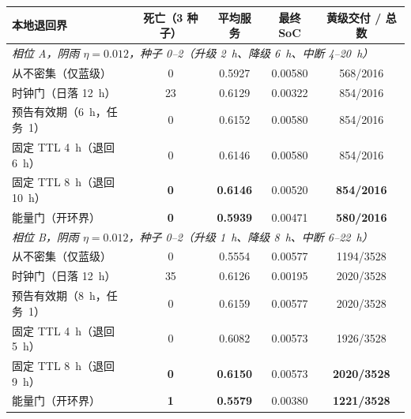 \begin{tabular}{lcccc}
\toprule
本地退回界 & 死亡（3 种子） & 平均服务 & 最终 SoC & 黄级交付 / 总数\\
\midrule
\multicolumn{5}{l}{\emph{相位 A，阴雨 $\eta{=}0.012$，种子 0--2（升级 2~h、降级 6~h、中断 4--20~h）}}\\
从不密集（仅蓝级） & 0 & 0.5927 & 0.00580 & 568/2016\\
时钟门（日落 12~h） & 23 & 0.6129 & 0.00322 & 854/2016\\
预告有效期（6~h，任务~1） & 0 & 0.6152 & 0.00580 & 854/2016\\
固定 TTL 4~h（退回 6~h） & 0 & 0.6146 & 0.00580 & 854/2016\\
固定 TTL 8~h（退回 10~h） & \textbf{0} & \textbf{0.6146} & 0.00520 & \textbf{854/2016}\\
能量门（开环界） & \textbf{0} & \textbf{0.5939} & 0.00471 & \textbf{580/2016}\\
\midrule
\multicolumn{5}{l}{\emph{相位 B，阴雨 $\eta{=}0.012$，种子 0--2（升级 1~h、降级 8~h、中断 6--22~h）}}\\
从不密集（仅蓝级） & 0 & 0.5554 & 0.00577 & 1194/3528\\
时钟门（日落 12~h） & 35 & 0.6126 & 0.00195 & 2020/3528\\
预告有效期（8~h，任务~1） & 0 & 0.6159 & 0.00577 & 2020/3528\\
固定 TTL 4~h（退回 5~h） & 0 & 0.6082 & 0.00573 & 1926/3528\\
固定 TTL 8~h（退回 9~h） & \textbf{0} & \textbf{0.6150} & 0.00573 & \textbf{2020/3528}\\
能量门（开环界） & \textbf{1} & \textbf{0.5579} & 0.00380 & \textbf{1221/3528}\\
\bottomrule
\end{tabular}
